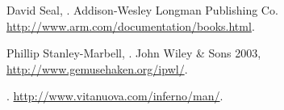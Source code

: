\documentclass[11pt]{p9article}
\newcommand{\hrefx}[1]{\href{#1}{#1}} %
\begin{document}
\begin{thebibliography}{1}
	David Seal,
	.
	\newblock Addison-Wesley Longman Publishing Co.
	\newblock \hrefx{http://www.arm.com/documentation/books.html}.
	
	Phillip Stanley-Marbell,
	.
	\newblock John Wiley \& Sons 2003,
	\newblock \hrefx{http://www.gemusehaken.org/ipwl/}.

	.
	\newblock \hrefx{http://www.vitanuova.com/inferno/man/}.
	
\end{thebibliography}
\end{document}
